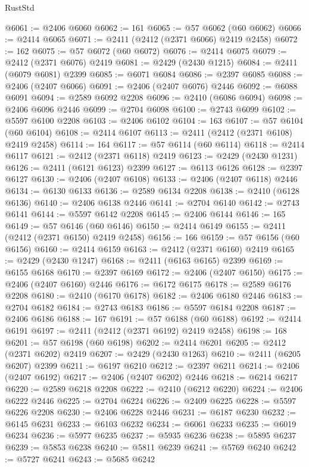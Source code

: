 \begin{lexlean}{RustStd}
\begin{coremodule}
@6061 := @2406 @6060
@6062 := 161
@6065 := @57 @6062 (@60 @6062)
@6066 := @2414 @6065
@6071 := @2411 (@2412 (@2371 @6066) @2419 @2458)
@6072 := 162
@6075 := @57 @6072 (@60 @6072)
@6076 := @2414 @6075
@6079 := @2412 (@2371 @6076) @2419
@6081 := @2429 (@2430 @1215)
@6084 := @2411 (@6079 @6081) @2399
@6085 := @6071 @6084
@6086 := @2397 @6085
@6088 := @2406 (@2407 @6066)
@6091 := @2406 (@2407 @6076) @2446
@6092 := @6088 @6091
@6094 := @2589 @6092 @2208
@6096 := @2410 (@6086 @6094)
@6098 := @2406 @6096 @2446
@6099 := @2704 @6098
@6100 := @2743 @6099
@6102 := @5597 @6100 @2208
@6103 := @2406 @6102
@6104 := 163
@6107 := @57 @6104 (@60 @6104)
@6108 := @2414 @6107
@6113 := @2411 (@2412 (@2371 @6108) @2419 @2458)
@6114 := 164
@6117 := @57 @6114 (@60 @6114)
@6118 := @2414 @6117
@6121 := @2412 (@2371 @6118) @2419
@6123 := @2429 (@2430 @1231)
@6126 := @2411 (@6121 @6123) @2399
@6127 := @6113 @6126
@6128 := @2397 @6127
@6130 := @2406 (@2407 @6108)
@6133 := @2406 (@2407 @6118) @2446
@6134 := @6130 @6133
@6136 := @2589 @6134 @2208
@6138 := @2410 (@6128 @6136)
@6140 := @2406 @6138 @2446
@6141 := @2704 @6140
@6142 := @2743 @6141
@6144 := @5597 @6142 @2208
@6145 := @2406 @6144
@6146 := 165
@6149 := @57 @6146 (@60 @6146)
@6150 := @2414 @6149
@6155 := @2411 (@2412 (@2371 @6150) @2419 @2458)
@6156 := 166
@6159 := @57 @6156 (@60 @6156)
@6160 := @2414 @6159
@6163 := @2412 (@2371 @6160) @2419
@6165 := @2429 (@2430 @1247)
@6168 := @2411 (@6163 @6165) @2399
@6169 := @6155 @6168
@6170 := @2397 @6169
@6172 := @2406 (@2407 @6150)
@6175 := @2406 (@2407 @6160) @2446
@6176 := @6172 @6175
@6178 := @2589 @6176 @2208
@6180 := @2410 (@6170 @6178)
@6182 := @2406 @6180 @2446
@6183 := @2704 @6182
@6184 := @2743 @6183
@6186 := @5597 @6184 @2208
@6187 := @2406 @6186
@6188 := 167
@6191 := @57 @6188 (@60 @6188)
@6192 := @2414 @6191
@6197 := @2411 (@2412 (@2371 @6192) @2419 @2458)
@6198 := 168
@6201 := @57 @6198 (@60 @6198)
@6202 := @2414 @6201
@6205 := @2412 (@2371 @6202) @2419
@6207 := @2429 (@2430 @1263)
@6210 := @2411 (@6205 @6207) @2399
@6211 := @6197 @6210
@6212 := @2397 @6211
@6214 := @2406 (@2407 @6192)
@6217 := @2406 (@2407 @6202) @2446
@6218 := @6214 @6217
@6220 := @2589 @6218 @2208
@6222 := @2410 (@6212 @6220)
@6224 := @2406 @6222 @2446
@6225 := @2704 @6224
@6226 := @2409 @6225
@6228 := @5597 @6226 @2208
@6230 := @2406 @6228 @2446
@6231 := @6187 @6230
@6232 := @6145 @6231
@6233 := @6103 @6232
@6234 := @6061 @6233
@6235 := @6019 @6234
@6236 := @5977 @6235
@6237 := @5935 @6236
@6238 := @5895 @6237
@6239 := @5853 @6238
@6240 := @5811 @6239
@6241 := @5769 @6240
@6242 := @5727 @6241
@6243 := @5685 @6242

\end{coremodule}
\end{lexlean}
